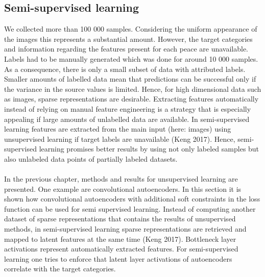 \subsection{Semi-supervised learning}
\label{sec:SemiSupervisedLearning}

We collected more than 100 000 samples. Considering the uniform appearance of the images this represents a substantial amount. However, the target categories and information regarding the features present for each peace are unavailable. Labels had to be manually generated which was done for around 10 000 samples. As a consequence, there is only a small subset of data with attributed labels. Smaller amounts of labelled data mean that predictions can be successful only if the variance in the source values is limited. Hence, for high dimensional data such as images, sparse representations are desirable. Extracting features automatically instead of relying on manual feature engineering is a strategy that is especially appealing if large amounts of unlabelled data are available. In semi-supervised learning features are extracted from the main input (here: images) using unsupervised learning if target labels are unavailable (Keng 2017). Hence, semi-supervised learning promises better results by using not only labeled samples but also unlabeled data points of partially labeled datasets.\\
\\
In the previous chapter, methods and results for unsupervised learning are presented. One example are convolutional autoencoders. In this section it is shown how convolutional autoencoders with additional soft constraints in the loss function can be used for semi supervised learning. Instead of computing another dataset of sparse representations that contains the results of unsupervised methods, in semi-supervised learning sparse representations are retrieved and mapped to latent features at the same time (Keng 2017). Bottleneck layer activations represent automatically extracted features. For semi-supervised learning one tries to enforce that latent layer activations of autoencoders correlate with the target categories. \\
\\
